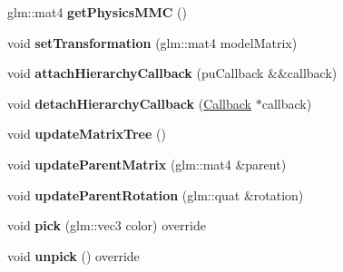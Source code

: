 \begin{DoxyCompactItemize}
\item 
glm\+::mat4 {\bfseries get\+Physics\+M\+MC} ()\hypertarget{classflw_1_1flf_1_1Entity_a6a3333d6d3ded22c2e3f3cfbcf657d69}{}\label{classflw_1_1flf_1_1Entity_a6a3333d6d3ded22c2e3f3cfbcf657d69}

\item 
void {\bfseries set\+Transformation} (glm\+::mat4 model\+Matrix)\hypertarget{classflw_1_1flf_1_1Entity_a21f8d43b4c42ea9082aecf795a3cecba}{}\label{classflw_1_1flf_1_1Entity_a21f8d43b4c42ea9082aecf795a3cecba}

\item 
void {\bfseries attach\+Hierarchy\+Callback} (pu\+Callback \&\&callback)\hypertarget{classflw_1_1flf_1_1Entity_ae13f1924e429aa49a39b25609ff2ad47}{}\label{classflw_1_1flf_1_1Entity_ae13f1924e429aa49a39b25609ff2ad47}

\item 
void {\bfseries detach\+Hierarchy\+Callback} (\hyperlink{classflw_1_1flf_1_1Callback}{Callback} $\ast$callback)\hypertarget{classflw_1_1flf_1_1Entity_a377051ff8a193e62c315b7b83f5884f2}{}\label{classflw_1_1flf_1_1Entity_a377051ff8a193e62c315b7b83f5884f2}

\item 
void {\bfseries update\+Matrix\+Tree} ()\hypertarget{classflw_1_1flf_1_1Entity_a1a155562e5efcb4523ba78c9f817fafb}{}\label{classflw_1_1flf_1_1Entity_a1a155562e5efcb4523ba78c9f817fafb}

\item 
void {\bfseries update\+Parent\+Matrix} (glm\+::mat4 \&parent)\hypertarget{classflw_1_1flf_1_1Entity_a7296824e646e0d2c4918f258c8af68ed}{}\label{classflw_1_1flf_1_1Entity_a7296824e646e0d2c4918f258c8af68ed}

\item 
void {\bfseries update\+Parent\+Rotation} (glm\+::quat \&rotation)\hypertarget{classflw_1_1flf_1_1Entity_abfb12e4454297961e8345dc70eba43f6}{}\label{classflw_1_1flf_1_1Entity_abfb12e4454297961e8345dc70eba43f6}

\item 
void {\bfseries pick} (glm\+::vec3 color) override\hypertarget{classflw_1_1flf_1_1Entity_aabe261a3cbe923400f5b591e6c2dd782}{}\label{classflw_1_1flf_1_1Entity_aabe261a3cbe923400f5b591e6c2dd782}

\item 
void {\bfseries unpick} () override\hypertarget{classflw_1_1flf_1_1Entity_a96099d66fce38fb7b4b98988d95dda21}{}\label{classflw_1_1flf_1_1Entity_a96099d66fce38fb7b4b98988d95dda21}


\end{DoxyCompactItemize}

